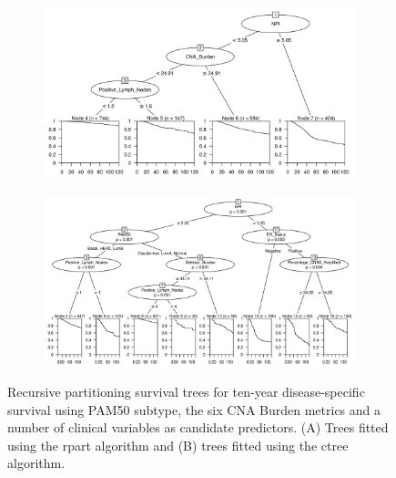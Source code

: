 \begin{figure}[!h]
\centering

\vspace{1cm}

\begin{subfigure}{\textwidth}
\subcaption{}
\includegraphics[width=1\textwidth]{../figures/Chapter_3/Clin_PartyKit_Survival_Burden_TenYearDSS_PAM50.png}
\end{subfigure}

\vspace{3cm}

\begin{subfigure}{\textwidth}
\subcaption{}
\includegraphics[width=1\textwidth]{../figures/Chapter_3/Clin_Ctree_Survival_Burden_TenYearDSS_PAM50.png}
\end{subfigure}

\vspace{1cm}

\caption[Recursive partitioning survival trees for ten-year disease-specific survival using PAM50 subtype, the six CNA Burden metrics and a number of clinical variables as candidate predictors.]{Recursive partitioning survival trees for ten-year disease-specific survival using PAM50 subtype, the six CNA Burden metrics and a number of clinical variables as candidate predictors. (A) Trees fitted using the rpart algorithm and (B) trees fitted using the ctree algorithm.}
\label{fig:PAM50_CNA_Burden_TenYearDSS_Clin}
\end{figure}

